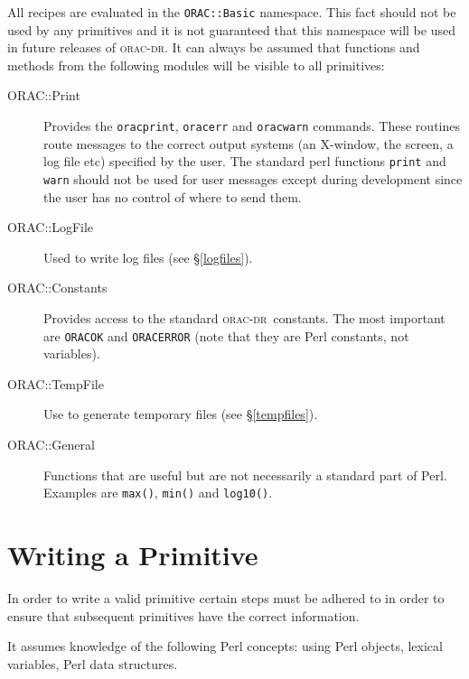 \documentclass[twoside,11pt]{article}
\renewcommand{\_}{\texttt{\symbol{95}}}
\newcommand{\Oracdr}{\textsc{orac-dr}}
\begin{document}
All recipes are evaluated in the \texttt{ORAC::Basic} namespace.
This fact should not be used by any primitives and it is not
guaranteed that this namespace will be used in future releases 
of \Oracdr. It can always be assumed that functions and methods from the
following modules will be visible to all primitives:

\begin{description}
\item[ORAC::Print] \mbox{}

Provides the \texttt{orac\_print}, \texttt{orac\_err} and
\texttt{orac\_warn} commands. These routines route messages to 
the correct output systems (an X-window, the screen, a log file etc)
specified by the user. The standard perl functions \texttt{print} and
\texttt{warn} should not be used for user messages except during
development since the user has no control of where to send them.

\item[ORAC::LogFile] \mbox{}

Used to write log files (see \S\ref{logfiles}).

\item[ORAC::Constants] \mbox{}

Provides access to the standard \Oracdr\ constants. The most important
are \texttt{ORAC\_\_OK} and \texttt{ORAC\_\_ERROR} (note that they 
are Perl constants, not variables).

\item[ORAC::TempFile] \mbox{}

Use to generate temporary files (see \S\ref{tempfiles}).

\item[ORAC::General] \mbox{}

Functions that are useful but are not necessarily a standard part of
Perl. Examples are \texttt{max()}, \texttt{min()} and \texttt{log10()}.

\end{description}


\section{Writing a Primitive}

In order to write a valid primitive certain steps must
be adhered to in order to ensure that subsequent primitives
have the correct information.

It assumes knowledge of the following Perl concepts:
using Perl objects, lexical variables, Perl data
structures. 
\end{document}
